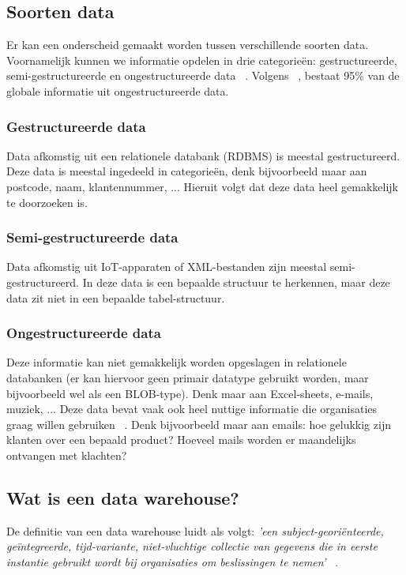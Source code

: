 \subsection{Soorten data}
Er kan een onderscheid gemaakt worden tussen verschillende soorten data. Voornamelijk kunnen we informatie opdelen in drie categorieën: gestructureerde, semi-gestructureerde en ongestructureerde data ~\autocite{Buneman1997}. Volgens  ~\textcite{Langseth2005}, bestaat 95\% van de globale informatie uit ongestructureerde data. 

\subsubsection{Gestructureerde data}
Data afkomstig uit een relationele databank (RDBMS) is meestal gestructureerd. Deze data is meestal ingedeeld in categorieën, denk bijvoorbeeld maar aan postcode, naam, klantennummer, ... Hieruit volgt dat deze data heel gemakkelijk te doorzoeken is. 

\subsubsection{Semi-gestructureerde data}
Data afkomstig uit IoT-apparaten of XML-bestanden zijn meestal semi-gestructureerd. In deze data is een bepaalde structuur te herkennen, maar deze data zit niet in een bepaalde tabel-structuur.

\subsubsection{Ongestructureerde data}
Deze informatie kan niet gemakkelijk worden opgeslagen in relationele databanken (er kan hiervoor geen primair datatype gebruikt worden, maar bijvoorbeeld wel als een BLOB-type). Denk maar aan Excel-sheets, e-mails, muziek, ... Deze data bevat vaak ook heel nuttige informatie die organisaties graag willen gebruiken ~\autocite{McAfee2012}. Denk bijvoorbeeld maar aan emails: hoe gelukkig zijn klanten over een bepaald product? Hoeveel mails worden er maandelijks ontvangen met klachten? 

\subsection{Wat is een data warehouse?}
De definitie van een data warehouse luidt als volgt: \textit{'een subject-georiënteerde, geïntegreerde, tijd-variante, niet-vluchtige collectie van gegevens die in eerste instantie gebruikt wordt bij organisaties om beslissingen te nemen'} ~\autocite{Inmon2005}.

